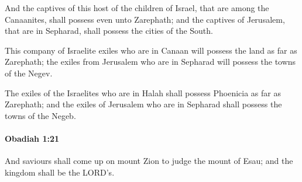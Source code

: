 			\begin{versebox}
					\item[BHS] 
					\item[LXX] 
					\item[ASV] And the captives of this host of the children of Israel, that are among the Canaanites, shall possess even unto Zarephath; and the captives of Jerusalem, that are in Sepharad, shall possess the cities of the South.
					\item[NIV] This company of Israelite exiles who are in Canaan will possess the land as far as Zarephath; the exiles from Jerusalem who are in Sepharad will possess the towns of the Negev.
					\item[NRSV] The exiles of the Israelites who are in Halah shall possess Phoenicia as far as Zarephath; and the exiles of Jerusalem who are in Sepharad shall possess the towns of the Negeb.
			\end{versebox}

		\paragraph{Obadiah 1:21} %
			\label{OBADIAH-1-21}

			And saviours shall come up on mount Zion to judge the mount of Esau; and the kingdom shall be the LORD’s.

